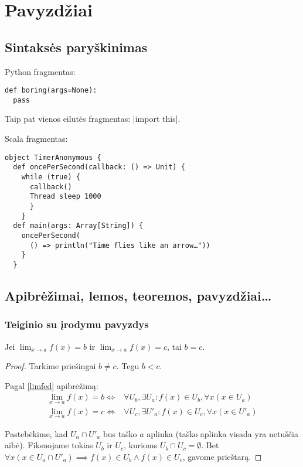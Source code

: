 \chapter{Pavyzdžiai}

\section{Sintaksės paryškinimas}

Python fragmentas:
\begin{verbatim}
def boring(args=None):
  pass
\end{verbatim}

Taip pat vienos eilutės fragmentas: |import this|.

Scala fragmentas:
\begin{verbatim}
object TimerAnonymous {
  def oncePerSecond(callback: () => Unit) {
    while (true) {
      callback()
      Thread sleep 1000
      }
    }
  def main(args: Array[String]) {
    oncePerSecond(
      () => println("Time flies like an arrow…"))
    }
  }
\end{verbatim}

\section{Apibrėžimai, lemos, teoremos, pavyzdžiai…}

\subsection{Teiginio su įrodymu pavyzdys}

\begin{prop}
  Jei $\lim_{x \to a} f(x) = b$ ir $\lim_{x \to a} f(x) = c$, tai $b = c$.
  \begin{proof}
    Tarkime priešingai $b \neq c$. Tegu $b < c$.

    Pagal \ref{limfed} apibrėžimą:
    \begin{align*}
      \lim_{x \to a} f(x) = b \iff &
        \forall U_{b}, \exists U_{a} :
        f(x) \in U_{b}, \forall x(x \in U_{a}) \\
      \lim_{x \to a} f(x) = c \iff &
        \forall U_{c}, \exists U'_{a} :
        f(x) \in U_{c}, \forall x(x \in U'_{a})
    \end{align*}

    Pastebėkime, kad $U_{a} \cap U'_{a}$ bus taško $a$ aplinka (taško
    aplinka visada yra netuščia aibė).
    Fiksuojame tokias $U_{b}$ ir $U_{c}$, kurioms
    $U_{b} \cap U_{c} = \emptyset$. Bet
    $\forall x (x \in U_{a} \cap U'_{a}) \implies
      f(x) \in U_{b} \land f(x) \in U_{c}$, gavome prieštarą.
  \end{proof}
\end{prop}

